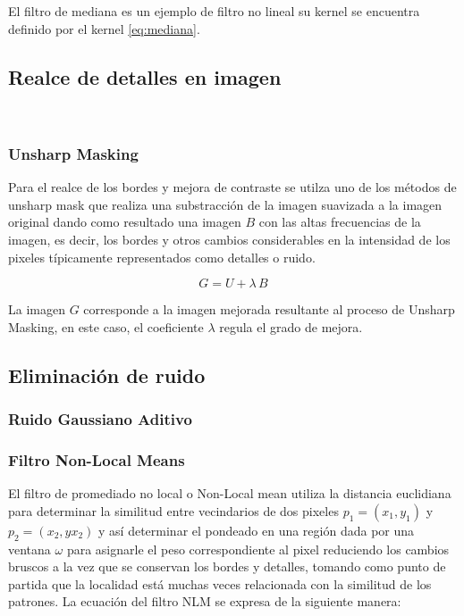 El filtro de mediana es un ejemplo de filtro no lineal su kernel se encuentra definido por el kernel \ref{eq:mediana}. 




\subsection{Realce de detalles en imagen}\

\subsubsection{Unsharp Masking}

Para el realce de los bordes y mejora de contraste se utilza uno de los m\'etodos de unsharp mask que realiza una substracci\'on de la imagen suavizada a la imagen original dando como resultado una imagen $B$ con las altas frecuencias de la imagen, es decir, los bordes y otros cambios considerables en la intensidad de los pixeles t\'ipicamente representados como detalles o ruido.

\begin{equation}
\label{eq:unsharpmask}
G=U+\lambda\,B
\end{equation}

La imagen $G$ corresponde a la imagen mejorada resultante al proceso de Unsharp Masking, en este caso, el coeficiente $\lambda$ regula el grado de mejora. 


\subsection{Eliminaci\'on de ruido}

\subsubsection{Ruido Gaussiano Aditivo}

\subsubsection{Filtro Non-Local Means}

El filtro de promediado no local o Non-Local mean utiliza la distancia euclidiana para determinar la similitud entre vecindarios de dos pixeles $p_{1}=\left(x_{1},y_{1}\right)$
y $p_{2}=\left(x_{2},yx_{2}\right)$ y as\'i determinar el pondeado en una regi\'on dada por una ventana $\omega$ para asignarle el peso correspondiente al pixel reduciendo los cambios bruscos a la vez que se conservan los bordes y detalles, tomando como punto de partida que la localidad est\'a muchas veces relacionada con la similitud de los patrones. La ecuaci\'on del filtro NLM se expresa de la siguiente manera:

